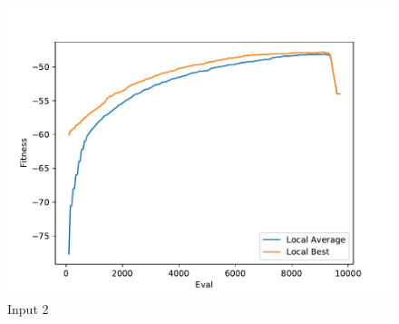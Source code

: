 \documentclass{standalone}
\begin{document}
\begin{figure}[!htb]
	\caption{Input 2}
	\label{fig:graph_2008}
	\includegraphics[width=\textwidth]{../graphs/graphs/2008.pdf}
\end{figure}
\end{document}
